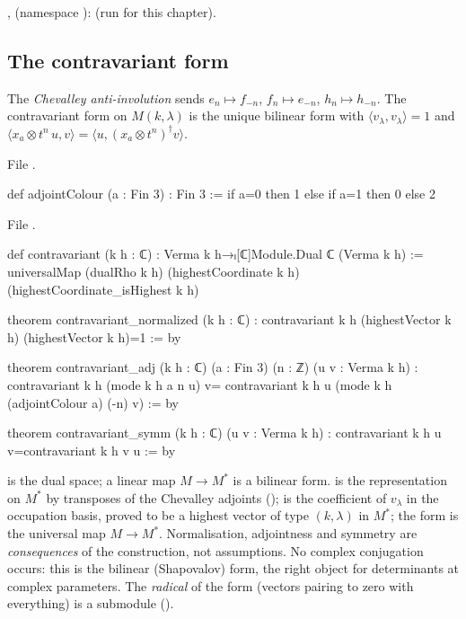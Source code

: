 \begin{status}
\allowbreak{},  (namespace
\allowbreak{}\allowbreak{}): \lean{[propext, Classical.}\allowbreak{}\allowbreak\lean{sound]} (run for this
chapter).
\end{status}

\subsection{The contravariant form}

\begin{definition}\label{l08:def:contravariant}
The \emph{Chevalley anti-involution} sends $e_n\mapsto f_{-n}$, $f_n\mapsto e_{-n}$, $h_n\mapsto h_{-n}$.
The contravariant form on $M(k,\lambda)$ is the unique bilinear form with $\langle v_\lambda,v_\lambda\rangle=1$ and
$\langle x_a\otimes t^n\,u, v\rangle = \langle u, (x_a\otimes t^n)^\dagger v\rangle$.
\end{definition}

\noindent File .
\begin{leancode}
def adjointColour (a : Fin 3) : Fin 3 := if a=0 then 1 else if a=1 then 0 else 2
\end{leancode}
\noindent File .
\begin{leancode}
def contravariant (k h : ℂ) : Verma k h→ₗ[ℂ]Module.Dual ℂ (Verma k h) :=
  universalMap (dualRho k h) (highestCoordinate k h) (highestCoordinate_isHighest k h)

theorem contravariant_normalized (k h : ℂ) :
    contravariant k h (highestVector k h) (highestVector k h)=1 := by

theorem contravariant_adj (k h : ℂ) (a : Fin 3) (n : ℤ) (u v : Verma k h) :
    contravariant k h (mode k h a n u) v=
      contravariant k h u (mode k h (adjointColour a) (-n) v) := by

theorem contravariant_symm (k h : ℂ) (u v : Verma k h) :
    contravariant k h u v=contravariant k h v u := by
\end{leancode}

\begin{dictionary}
 is the dual space; a linear map $M\to M^*$ is a bilinear form. 
is the representation on $M^*$ by transposes of the Chevalley adjoints ();
 is the coefficient of $v_\lambda$ in the occupation basis, proved to be a highest
vector of type $(k,\lambda)$ in $M^*$; the form is the universal map $M\to M^*$. Normalisation, adjointness
and symmetry are \emph{consequences} of the construction, not assumptions. No complex conjugation
occurs: this is the bilinear (Shapovalov) form, the right object for determinants at complex
parameters. The \emph{radical} of the form (vectors pairing to zero with everything) is a submodule
(\allowbreak{}\allowbreak{}).
\end{dictionary}

